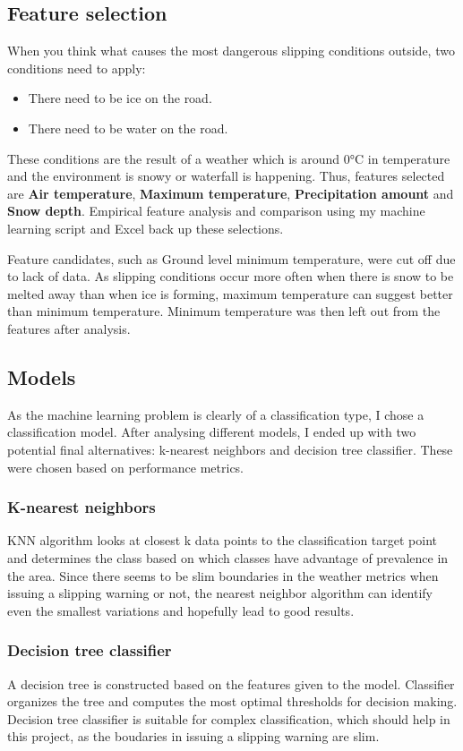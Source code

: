 \documentclass[12pt, a4paper]{article}
\begin{document}
    \subsection{Feature selection}
    When you think what causes the most dangerous slipping conditions outside, two conditions need to apply:
    \begin{itemize}
      \item There need to be ice on the road.
      \item There need to be water on the road.
    \end{itemize}
    These conditions are the result of a weather which is around 0°C in temperature and the environment is snowy or waterfall is happening.
    Thus, features selected are \textbf{Air temperature}, \textbf{Maximum temperature}, \textbf{Precipitation amount} and \textbf{Snow depth}. Empirical feature analysis 
    and comparison using my machine learning script and Excel back up these selections. 

    Feature candidates, such as Ground level minimum temperature, were cut off due to lack of data.
    As slipping conditions occur more often when there is snow to be melted away than when ice is forming, maximum temperature can
    suggest better than minimum temperature. Minimum temperature was then left out from the features after analysis.

    \subsection{Models}
    As the machine learning problem is clearly of a classification type, I chose a classification model.
    After analysing different models, I ended up with two potential final alternatives: k-nearest neighbors and decision tree
    classifier. These were chosen based on performance metrics.
  
    \subsubsection{K-nearest neighbors}
    KNN algorithm looks at closest k data points
    to the classification target point and determines the class based on which classes have advantage of prevalence in the area.
    Since there seems to be slim boundaries in the weather metrics when issuing a slipping warning or not, the nearest neighbor
    algorithm can identify even the smallest variations and hopefully lead to good results.

    \subsubsection{Decision tree classifier}
    A decision tree is constructed based on the features given to the model. Classifier organizes the tree and computes
    the most optimal thresholds for decision making.
    Decision tree classifier is suitable for complex classification, which should help in this project, as the
    boudaries in issuing a slipping warning are slim.
    
\end{document}
